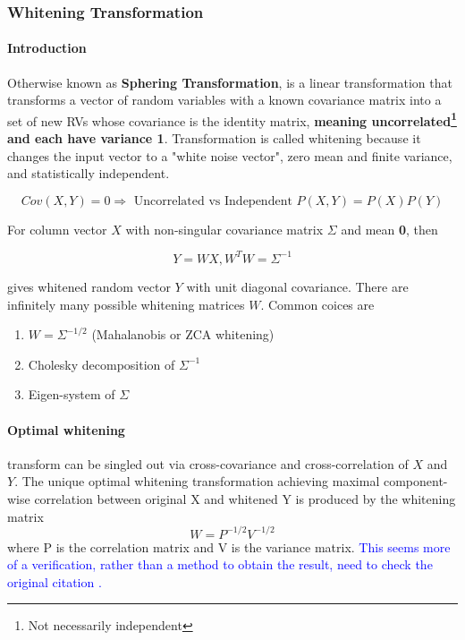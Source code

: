 \subsubsection{Whitening Transformation}

\paragraph{Introduction}

Otherwise known as \textbf{Sphering Transformation}, is a linear transformation
that transforms a vector of random variables with a known covariance
matrix into a set of new RVs whose covariance is the identity matrix,
\textbf{meaning uncorrelated\footnote{Not necessarily independent} and each have variance 1}.  
Transformation is called whitening because it changes the input vector
to a "white noise vector", zero mean and finite variance, and statistically independent. 

\begin{equation*}
    Cov(X, Y) = 0 \Rightarrow \text{ Uncorrelated vs Independent } P(X, Y) = P(X)P(Y)
\end{equation*}

For column vector $X$ with non-singular covariance matrix $\Sigma$ and mean \textbf{0}, then

\begin{equation*}
    Y = WX, W^TW = \Sigma^{-1}
\end{equation*} 

gives whitened random vector $Y$ with unit diagonal covariance. There are infinitely many possible
whitening matrices $W$. Common coices are

\begin{enumerate}[itemsep=0pt]
    \item $W=\Sigma^{-1/2}$ (Mahalanobis or ZCA whitening)
    \item Cholesky decomposition of $\Sigma^{-1}$
    \item Eigen-system of $\Sigma$
\end{enumerate}

\paragraph{Optimal whitening} transform can be singled out via cross-covariance and cross-correlation of 
$X$ and $Y$. The unique optimal whitening transformation achieving maximal component-wise
correlation between original X and whitened Y is produced by the whitening matrix
\begin{equation*}
    W=P^{-1/2}V^{-1/2}
\end{equation*}
where P is the correlation matrix and V is the variance matrix. 
\textcolor{blue}{
    This seems more of a verification, rather than a method to obtain the result,
    need to check the original citation \cite{optimal_whitening}. 
}

